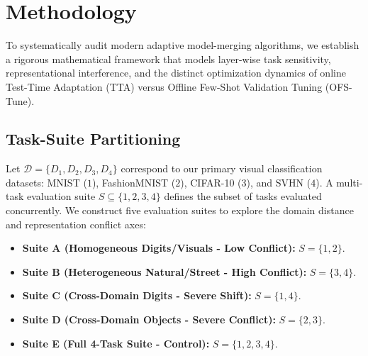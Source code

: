 \section{Methodology}
\label{sec:methodology}

To systematically audit modern adaptive model-merging algorithms, we establish a rigorous mathematical framework that models layer-wise task sensitivity, representational interference, and the distinct optimization dynamics of online Test-Time Adaptation (TTA) versus Offline Few-Shot Validation Tuning (OFS-Tune).

\subsection{Task-Suite Partitioning}
Let $\mathcal{D} = \{D_1, D_2, D_3, D_4\}$ correspond to our primary visual classification datasets: MNIST ($1$), FashionMNIST ($2$), CIFAR-10 ($3$), and SVHN ($4$).
A multi-task evaluation suite $S \subseteq \{1, 2, 3, 4\}$ defines the subset of tasks evaluated concurrently.
We construct five evaluation suites to explore the domain distance and representation conflict axes:
\begin{itemize}
    \item \textbf{Suite A (Homogeneous Digits/Visuals - Low Conflict):} $S = \{1, 2\}$.
    \item \textbf{Suite B (Heterogeneous Natural/Street - High Conflict):} $S = \{3, 4\}$.
    \item \textbf{Suite C (Cross-Domain Digits - Severe Shift):} $S = \{1, 4\}$.
    \item \textbf{Suite D (Cross-Domain Objects - Severe Conflict):} $S = \{2, 3\}$.
    \item \textbf{Suite E (Full 4-Task Suite - Control):} $S = \{1, 2, 3, 4\}$.
\end{itemize}

